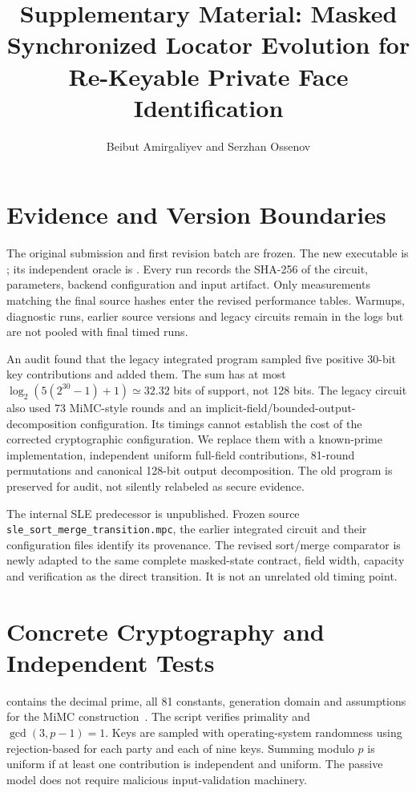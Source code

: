 \documentclass[journal,onecolumn]{IEEEtran}
\begin{document}
\title{Supplementary Material: Masked Synchronized Locator Evolution for Re-Keyable Private Face Identification}
\author{Beibut Amirgaliyev and Serzhan Ossenov}\maketitle

\section{Evidence and Version Boundaries}
The original submission and first revision batch are frozen. The new executable is ; its independent oracle is . Every run records the SHA-256 of the circuit, parameters, backend configuration and input artifact. Only measurements matching the final source hashes enter the revised performance tables. Warmups, diagnostic runs, earlier source versions and legacy circuits remain in the logs but are not pooled with final timed runs.

An audit found that the legacy integrated program sampled five positive 30-bit key contributions and added them. The sum has at most $\log_2(5(2^{30}-1)+1)\simeq32.32$ bits of support, not 128 bits. The legacy circuit also used 73 MiMC-style rounds and an implicit-field/bounded-output-decomposition configuration. Its timings cannot establish the cost of the corrected cryptographic configuration. We replace them with a known-prime implementation, independent uniform full-field contributions, 81-round permutations and canonical 128-bit output decomposition. The old program is preserved for audit, not silently relabeled as secure evidence.

The internal SLE predecessor is unpublished. Frozen source \texttt{sle\_sort\_merge\_transition.mpc}, the earlier integrated circuit and their configuration files identify its provenance. The revised sort/merge comparator is newly adapted to the same complete masked-state contract, field width, capacity and verification as the direct transition. It is not an unrelated old timing point.

\section{Concrete Cryptography and Independent Tests}
 contains the decimal prime, all 81 constants, generation domain and assumptions for the MiMC construction~\cite{albrecht2016mimc}. The script  verifies primality and $\gcd(3,p-1)=1$. Keys are sampled with operating-system randomness using rejection-based  for each party and each of nine keys. Summing modulo $p$ is uniform if at least one contribution is independent and uniform. The passive model does not require malicious input-validation machinery.
\end{document}
